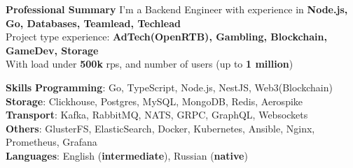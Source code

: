 \documentclass{resume}
\begin{document}

\begin{rSection}{\textbf{Professional Summary}}
{
    I'm a Backend Engineer with experience in \textbf{Node.js, Go, Databases, Teamlead, Techlead}
 \\ Project type experience: \textbf{AdTech(OpenRTB), Gambling, Blockchain, GameDev, Storage}
 \\ With load under \textbf{500k} rps, and  number of users (up to \textbf{1 million})
}

\end{rSection}
\begin{rSection}{\textbf{Skills}}
    \textbf{Programming}: Go, TypeScript, Node.js, NestJS, Web3(Blockchain)
    \\ \textbf{Storage}: Clickhouse, Postgres, MySQL, MongoDB, Redis, Aerospike
    \\ \textbf{Transport}: Kafka, RabbitMQ, NATS, GRPC, GraphQL, Websockets
    \\ \textbf{Others}: GlusterFS, ElasticSearch, Docker, Kubernetes, Ansible, Nginx, Prometheus, Grafana
    \\ \textbf{Languages}: English ({\textbf{intermediate}}), Russian ({\textbf{native}})
\end{rSection}
\end{document}

